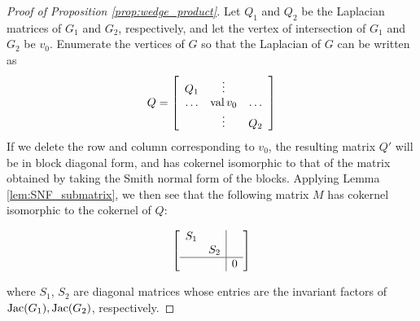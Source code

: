 \documentclass{amsart}
\begin{document}
\begin{proof}[Proof of Proposition \ref{prop:wedge_product}]
  Let $Q_1$ and $Q_2$ be the Laplacian matrices of $G_1$ and $G_2$,
  respectively, and let the vertex of intersection of $G_1$ and $G_2$
  be $v_0$. Enumerate the vertices of $G$ so that the Laplacian of $G$
  can be written as
\begin{equation*}
  Q = 
  \left[\begin{array}{ccc}
      Q_1 & \vdots & \\
      \ldots & \operatorname{val}{v_0}  & \ldots \\
      & \vdots & Q_2
  \end{array}\right]
\end{equation*}
If we delete the row and column corresponding to $v_0$, the resulting
matrix $Q'$ will be in block diagonal form, and has cokernel
isomorphic to that of the matrix obtained by taking the Smith normal
form of the blocks. Applying Lemma \ref{lem:SNF_submatrix}, we then
see that the following matrix $M$ has cokernel isomorphic to the
cokernel of $Q$:

\begin{equation*}
  \left[\begin{array}{cc|c}
      S_1 & \\
      & S_2 \\ \hline
      & & 0
    \end{array}\right]
\end{equation*}

where $S_1$, $S_2$ are diagonal matrices whose entries are the
invariant factors of $\operatorname{Jac}(G_1), \operatorname{Jac}(G_2)$, respectively.
\end{proof}
\end{document}

